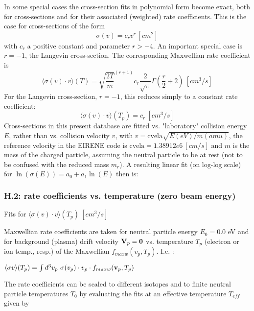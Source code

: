 \documentclass[12pt,dvipdfmx]{article}
\begin{document}
In some special cases the cross-section fits in polynomial form become exact, both for cross-sections and
for their associated (weighted) rate coefficients.
This is the case for cross-sections of the form
\begin{equation}
\sigma(v) = c_r v^r  \ [cm^2]
\end{equation}
with $c_r$ a positive constant and parameter $r>-4$. An important special case is $r=-1$, the Langevin cross-section.
The corresponding Maxwellian rate coefficient is
\begin{equation}
\langle\sigma(v) \cdot v  \rangle (T) = \sqrt{\frac {2T}{m}}^{(r+1)} c_r \frac{2}{\sqrt{\pi}}
\Gamma(\frac{r}{2}+2) \ [cm^3/s]
\end{equation}
For the Langevin cross-section, $r=-1$, this reduces simply to a constant rate coefficient:
\begin{equation}
\langle\sigma(v) \cdot v  \rangle (T_p) =  c_r  \ [cm^3/s]
\end{equation}
Cross-sections in this present database are fitted vs. "laboratory" collision energy $E$, rather than vs. collision velocity $v$, with $v=\mbox{cvela} \sqrt{E(eV)/m(amu)}$, the reference velocity
in the EIRENE code is $\mbox{cvela} = 1.38912 e6 \ [cm/s]$ and $m$ is the mass of the charged particle, assuming the neutral particle to be at rest (not to be confused with the reduced mass $m_r$). A resulting linear fit (on log-log scale) for
$\ln(\sigma(E)) = a_0 + a_1 \ln(E) $ then is:

\subsubsection{H.2: rate coefficients vs. temperature (zero beam energy)}\label{sec1.3.2}
Fits for $\langle\sigma(v) \cdot v  \rangle (T_p) \ [cm^3/s]$

Maxwellian rate coefficients are taken for neutral particle energy $E_0 = 0.0$ eV and for background (plasma) drift velocity ${\bf V}_p ={\bf 0}$
vs. temperature $T_p$ (electron or ion temp., resp.) of the Maxwellian $f_{maxw}(v_p,T_p)$.
I.e. :

$\langle\sigma v \rangle(T_p) = \int d^3v_p \ \sigma(v_{p}) \cdot v_{p} \cdot
f_{maxw}({\bf v}_{p},T_p)$

The rate coefficients can be scaled to different isotopes and to finite
neutral particle temperatures $T_0$ by evaluating the fits at an
effective temperature $T_{eff}$ given by
\end{document}
